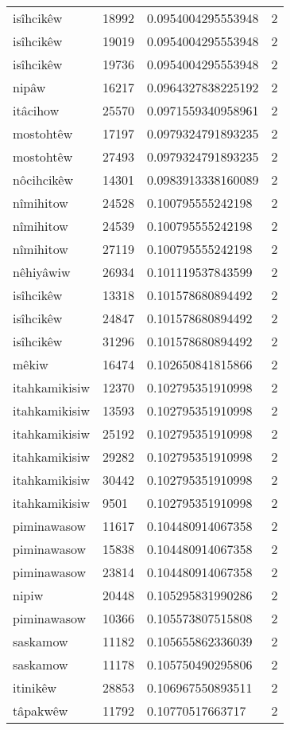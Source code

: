 \begin{longtable}{llll}
isîhcikêw & 18992 & 0.0954004295553948 & 2 \\
isîhcikêw & 19019 & 0.0954004295553948 & 2 \\
isîhcikêw & 19736 & 0.0954004295553948 & 2 \\
nipâw & 16217 & 0.0964327838225192 & 2 \\
itâcihow & 25570 & 0.0971559340958961 & 2 \\
mostohtêw & 17197 & 0.0979324791893235 & 2 \\
mostohtêw & 27493 & 0.0979324791893235 & 2 \\
nôcihcikêw & 14301 & 0.0983913338160089 & 2 \\
nîmihitow & 24528 & 0.100795555242198 & 2 \\
nîmihitow & 24539 & 0.100795555242198 & 2 \\
nîmihitow & 27119 & 0.100795555242198 & 2 \\
nêhiyâwiw & 26934 & 0.101119537843599 & 2 \\
isîhcikêw & 13318 & 0.101578680894492 & 2 \\
isîhcikêw & 24847 & 0.101578680894492 & 2 \\
isîhcikêw & 31296 & 0.101578680894492 & 2 \\
mêkiw & 16474 & 0.102650841815866 & 2 \\
itahkamikisiw & 12370 & 0.102795351910998 & 2 \\
itahkamikisiw & 13593 & 0.102795351910998 & 2 \\
itahkamikisiw & 25192 & 0.102795351910998 & 2 \\
itahkamikisiw & 29282 & 0.102795351910998 & 2 \\
itahkamikisiw & 30442 & 0.102795351910998 & 2 \\
itahkamikisiw & 9501 & 0.102795351910998 & 2 \\
piminawasow & 11617 & 0.104480914067358 & 2 \\
piminawasow & 15838 & 0.104480914067358 & 2 \\
piminawasow & 23814 & 0.104480914067358 & 2 \\
nipiw & 20448 & 0.105295831990286 & 2 \\
piminawasow & 10366 & 0.105573807515808 & 2 \\
saskamow & 11182 & 0.105655862336039 & 2 \\
saskamow & 11178 & 0.105750490295806 & 2 \\
itinikêw & 28853 & 0.106967550893511 & 2 \\
tâpakwêw & 11792 & 0.10770517663717 & 2 \\

\end{longtable}
